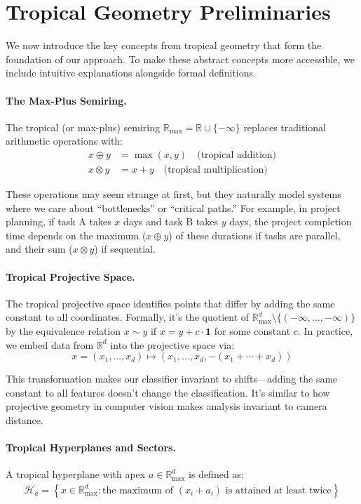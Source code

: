 \documentclass{article}
\newcommand{\R}{\mathbb{R}}
\newcommand{\Rmax}{\mathbb{R}_{\max}}
\begin{document}
\section{Tropical Geometry Preliminaries}\label{sec:prelim}

We now introduce the key concepts from tropical geometry that form the foundation of our approach. To make these abstract concepts more accessible, we include intuitive explanations alongside formal definitions.

\paragraph{The Max-Plus Semiring.}
The tropical (or max-plus) semiring $\Rmax = \R \cup \{-\infty\}$ replaces traditional arithmetic operations with:
\begin{align}
x \oplus y &= \max(x,y) \quad \text{(tropical addition)} \\
x \otimes y &= x + y \quad \text{(tropical multiplication)}
\end{align}

These operations may seem strange at first, but they naturally model systems where we care about ``bottlenecks'' or ``critical paths.'' For example, in project planning, if task A takes $x$ days and task B takes $y$ days, the project completion time depends on the maximum ($x \oplus y$) of these durations if tasks are parallel, and their sum ($x \otimes y$) if sequential.

\paragraph{Tropical Projective Space.}  
The tropical projective space identifies points that differ by adding the same constant to all coordinates. Formally, it's the quotient of $\Rmax^d \setminus \{(-\infty,\dots,-\infty)\}$ by the equivalence relation $x \sim y$ if $x = y + c \cdot \mathbf{1}$ for some constant $c$. In practice, we embed data from $\R^d$ into the projective space via:
\[
x=(x_1,\dots,x_d)\mapsto (x_1,\dots,x_d,-(x_1+\cdots+x_d))
\]

This transformation makes our classifier invariant to shifts—adding the same constant to all features doesn't change the classification. It's similar to how projective geometry in computer vision makes analysis invariant to camera distance.

\paragraph{Tropical Hyperplanes and Sectors.}
A tropical hyperplane with apex $a \in \Rmax^d$ is defined as:
\begin{align}
\mathcal{H}_a = \left\{ x \in \Rmax^d : \text{the maximum of }(x_i + a_i)\text{ is attained at least twice} \right\}
\end{align}
\end{document}
